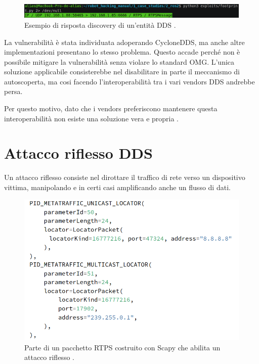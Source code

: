 \begin{figure}[H]
    \centering
    \includegraphics[width=15.2cm, keepaspectratio]{img/rispostarecoinnassance.png}
    \caption{Esempio di risposta discovery di un'entità DDS
    \cite{mayoral2022robot}.}
    \label{rispostarecoinnassance}
\end{figure}

La vulnerabilità è stata individuata adoperando 
CycloneDDS, ma anche altre implementazioni 
presentano lo stesso problema. 
Questo accade perché non è possibile mitigare 
la vulnerabilità senza violare lo standard 
OMG. L'unica soluzione applicabile consisterebbe 
nel disabilitare in parte il meccanismo di autoscoperta, 
ma cosi facendo l'interoperabilità tra i vari vendors 
DDS andrebbe persa. 

Per questo motivo, dato che i vendors 
preferiscono mantenere questa interoperabilità non esiste 
una soluzione vera e propria \cite{mayoral2022robot}.


\section{Attacco riflesso DDS}
Un attacco riflesso consiste nel dirottare il traffico 
di rete verso un dispositivo vittima, manipolando e in certi 
casi amplificando anche un flusso di dati.

\begin{figure}[H]
    \centering
    \includegraphics[width=15.2cm, keepaspectratio]{img/submessaggereflection.png}
    \caption{Parte di un pacchetto RTPS costruito con Scapy
    che abilita un attacco
    riflesso \cite{mayoral2022robot}.}
    \label{submessaggereflection}
\end{figure}

